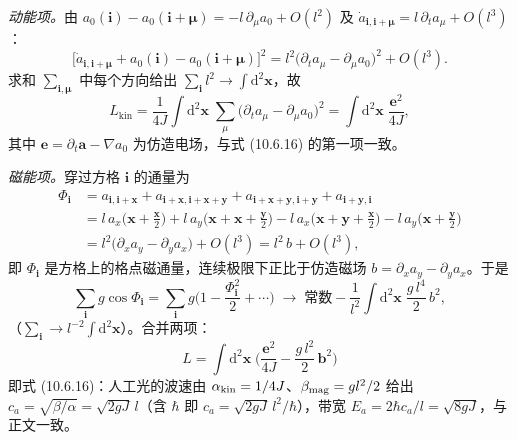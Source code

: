 \emph{动能项。}由 $a_0(\pmb i)-a_0(\pmb i+\pmb\mu)=-l\,\partial_\mu a_0+O(l^{2})$ 及 $\dot a_{\pmb i,\pmb i+\pmb\mu}=l\,\partial_t a_\mu+O(l^{3})$：
\begin{equation*}
\big[\dot a_{\pmb i,\pmb i+\pmb\mu}+a_0(\pmb i)-a_0(\pmb i+\pmb\mu)\big]^{2}
=l^{2}\big(\partial_t a_\mu-\partial_\mu a_0\big)^{2}+O(l^{3}) .
\end{equation*}
求和 $\sum_{\pmb i,\pmb\mu}$ 中每个方向给出 $\sum_{\pmb i}l^{2}\to\int\mathrm d^{2}\pmb x$，故
\begin{equation*}
L_{\text{kin}}=\frac{1}{4J}\int\mathrm d^{2}\pmb x\;
\sum_{\mu}\big(\partial_t a_\mu-\partial_\mu a_0\big)^{2}
=\int\mathrm d^{2}\pmb x\;\frac{\pmb e^{2}}{4J},
\end{equation*}
其中 $\pmb e=\partial_t\pmb a-\nabla a_0$ 为仿造电场，与式 (10.6.16) 的第一项一致。

\emph{磁能项。}穿过方格 $\pmb i$ 的通量为
\begin{align*}
\Phi_{\pmb i}&=a_{\pmb i,\pmb i+\pmb x}+a_{\pmb i+\pmb x,\pmb i+\pmb x+\pmb y}+a_{\pmb i+\pmb x+\pmb y,\pmb i+\pmb y}+a_{\pmb i+\pmb y,\pmb i}\\
&=l\,a_x\big(\pmb x+\tfrac{\pmb x}{2}\big)+l\,a_y\big(\pmb x+\pmb x+\tfrac{\pmb y}{2}\big)
-l\,a_x\big(\pmb x+\pmb y+\tfrac{\pmb x}{2}\big)-l\,a_y\big(\pmb x+\tfrac{\pmb y}{2}\big)\\
&=l^{2}\big(\partial_x a_y-\partial_y a_x\big)+O(l^{3})=l^{2}\,b+O(l^{3}),
\end{align*}
即 $\Phi_{\pmb i}$ 是方格上的格点磁通量，连续极限下正比于仿造磁场 $b=\partial_xa_y-\partial_ya_x$。于是
\begin{equation*}
\sum_{\pmb i}g\cos\Phi_{\pmb i}
=\sum_{\pmb i}g\Big(1-\frac{\Phi_{\pmb i}^{2}}{2}+\cdots\Big)
\;\longrightarrow\;\text{常数}-\frac{1}{l^{2}}\int\mathrm d^{2}\pmb x\;\frac{g\,l^{4}}{2}\,b^{2},
\end{equation*}
（$\sum_{\pmb i}\to l^{-2}\int\mathrm d^{2}\pmb x$）。合并两项：
\begin{equation*}
\boxed{\;L=\int\mathrm d^{2}\pmb x\;\Big(\frac{\pmb e^{2}}{4J}-\frac{g\,l^{2}}{2}\,\pmb b^{2}\Big)\;}
\end{equation*}
即式 (10.6.16)：人工光的波速由 $\alpha_{\rm kin}=1/4J$、$\beta_{\rm mag}=gl^{2}/2$ 给出 $c_a=\sqrt{\beta/\alpha}=\sqrt{2gJ}\,l$（含 $\hbar$ 即 $c_a=\sqrt{2gJ}\,l^{2}/\hbar$），带宽 $E_a=2\hbar c_a/l=\sqrt{8gJ}$，与正文一致。

